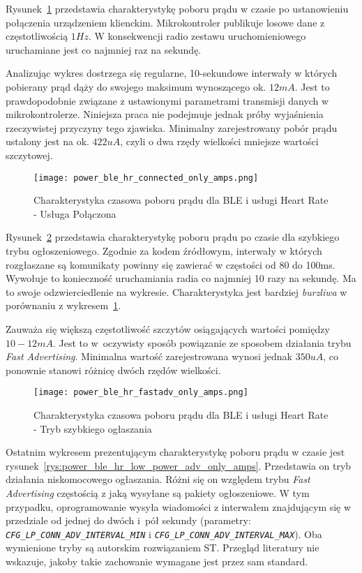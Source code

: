Rysunek~\ref{rys:power_ble_hr_connected_only_amps} przedstawia charakterystykę poboru prądu
w czasie po ustanowieniu połączenia urządzeniem klienckim. Mikrokontroler publikuje 
losowe dane z częstotliwością $1Hz$. W konsekwencji radio zestawu uruchomieniowego
uruchamiane jest co najmniej raz na sekundę.

Analizując wykres dostrzega się regularne, 10-sekundowe interwały w których pobierany prąd dąży do swojego
maksimum wynoszącego ok. $12mA$. Jest to prawdopodobnie związane z ustawionymi parametrami transmisji
danych w mikrokontrolerze. Niniejsza praca nie podejmuje jednak próby wyjaśnienia rzeczywistej przyczyny tego zjawiska.
Minimalny zarejestrowany pobór prądu ustalony jest na ok. $422uA$, czyli o dwa rzędy wielkości mniejsze wartości
szczytowej.


\begin{figure}[!ht]
	\centering \texttt{[image: power\_ble\_hr\_connected\_only\_amps.png]}
	\caption{Charakterystyka czasowa poboru prądu dla BLE i usługi Heart Rate - Usługa Połączona}
	\label{rys:power_ble_hr_connected_only_amps}
\end{figure}

Rysunek~\ref{rys:power_ble_hr_fastadv_only_amps} przedstawia charakterystykę poboru prądu po czasie
dla szybkiego trybu ogłoszeniowego. Zgodnie za kodem źródłowym, interwały w których rozgłaszane
są komunikaty powinny się zawierać w częstości od 80 do 100ms. Wywołuje to konieczność uruchamiania radia
co najmniej 10 razy na sekundę. Ma to swoje odzwierciedlenie na wykresie. Charakterystyka jest bardziej
\textit{burzliwa} w porównaniu z wykresem~\ref{rys:power_ble_hr_connected_only_amps}. 

Zauważa się większą częstotliwość szczytów osiągających wartości pomiędzy $10-12mA$. Jest to w~oczywisty
sposób powiązanie ze sposobem działania trybu \textit{Fast Advertising}. Minimalna wartość zarejestrowana wynosi jednak
$350uA$, co ponownie stanowi różnicę dwóch rzędów wielkości.

\begin{figure}[!ht]
	\centering \texttt{[image: power\_ble\_hr\_fastadv\_only\_amps.png]}
	\caption{Charakterystyka czasowa poboru prądu dla BLE i usługi Heart Rate - Tryb szybkiego ogłaszania}
	\label{rys:power_ble_hr_fastadv_only_amps}
\end{figure}

Ostatnim wykresem prezentującym charakterystykę poboru prądu w czasie jest rysunek~\ref{rys:power_ble_hr_low_power_adv_only_amps}.
Przedstawia on tryb działania niskomocowego ogłaszania. Różni się on względem trybu \textit{Fast Advertising} częstością z jaką wysyłane
są pakiety ogłoszeniowe. W tym przypadku, oprogramowanie wysyła wiadomości z interwałem znajdującym się w przedziale od 
jednej do dwóch i~pół sekundy (parametry: \textit{\texttt{CFG\_LP\_CONN\_ADV\_INTERVAL\_MIN}} i \textit{\texttt{CFG\_LP\_CONN\_ADV\_INTERVAL\_MAX}}). 
Oba wymienione tryby są autorskim rozwiązaniem ST. Przegląd literatury nie wskazuje, jakoby takie zachowanie wymagane
jest przez sam standard.

